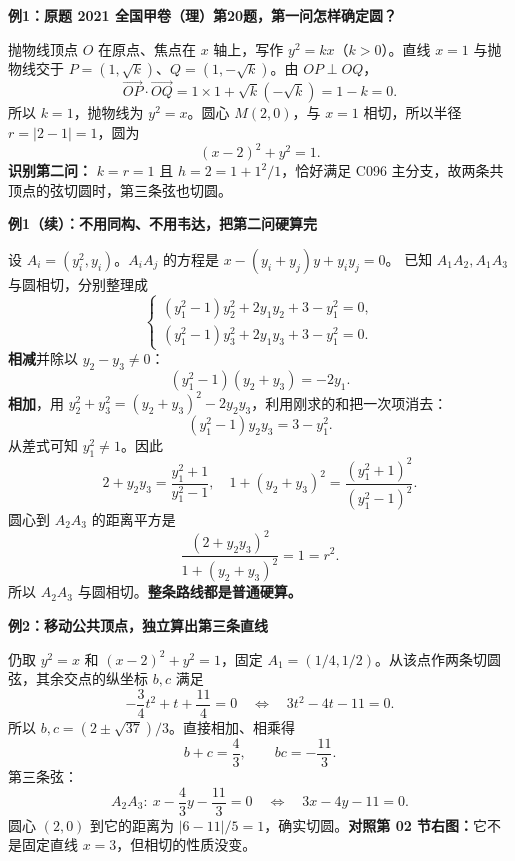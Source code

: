 \clearpage
\begin{examplebox}
\textbf{例1：原题 2021 全国甲卷（理）第20题，第一问怎样确定圆？}

抛物线顶点 $O$ 在原点、焦点在 $x$ 轴上，写作 $y^2=kx$（$k>0$）。直线 $x=1$ 与抛物线交于 $P=(1,\sqrt{k})$、$Q=(1,-\sqrt{k})$。由 $OP\perp OQ$，
\[
\overrightarrow{OP}\cdot\overrightarrow{OQ}
=1\times1+\sqrt{k}(-\sqrt{k})=1-k=0.
\]
所以 $k=1$，抛物线为 $\boxed{y^2=x}$。圆心 $M(2,0)$，与 $x=1$ 相切，所以半径 $r=|2-1|=1$，圆为
\[
\boxed{(x-2)^2+y^2=1}.
\]
\textbf{识别第二问：} $k=r=1$ 且 $h=2=1+1^2/1$，恰好满足 C096 主分支，故两条共顶点的弦切圆时，第三条弦也切圆。
\end{examplebox}

\clearpage
\begin{examplebox}
\textbf{例1（续）：不用同构、不用韦达，把第二问硬算完}

设 $A_i=(y_i^2,y_i)$。$A_iA_j$ 的方程是 $x-(y_i+y_j)y+y_iy_j=0$。
已知 $A_1A_2,A_1A_3$ 与圆相切，分别整理成
\[
\begin{cases}
(y_1^2-1)y_2^2+2y_1y_2+3-y_1^2=0,\\
(y_1^2-1)y_3^2+2y_1y_3+3-y_1^2=0.
\end{cases}
\]
\textbf{相减}并除以 $y_2-y_3\ne0$：
\[
(y_1^2-1)(y_2+y_3)=-2y_1.
\]
\textbf{相加}，用 $y_2^2+y_3^2=(y_2+y_3)^2-2y_2y_3$，利用刚求的和把一次项消去：
\[
(y_1^2-1)y_2y_3=3-y_1^2.
\]
从差式可知 $y_1^2\ne1$。因此
\[
2+y_2y_3=\frac{y_1^2+1}{y_1^2-1},\quad
1+(y_2+y_3)^2=\frac{(y_1^2+1)^2}{(y_1^2-1)^2}.
\]
圆心到 $A_2A_3$ 的距离平方是
\[
\frac{(2+y_2y_3)^2}{1+(y_2+y_3)^2}=1=r^2.
\]
所以 $A_2A_3$ 与圆相切。\textbf{整条路线都是普通硬算。}
\end{examplebox}

\clearpage
\begin{examplebox}
\textbf{例2：移动公共顶点，独立算出第三条直线}

仍取 $y^2=x$ 和 $(x-2)^2+y^2=1$，固定 $A_1=(1/4,1/2)$。从该点作两条切圆弦，其余交点的纵坐标 $b,c$ 满足
\[
-\frac34t^2+t+\frac{11}{4}=0
\quad\Longleftrightarrow\quad 3t^2-4t-11=0.
\]
所以 $b,c=(2\pm\sqrt{37})/3$。直接相加、相乘得
\[
b+c=\frac43,\qquad bc=-\frac{11}{3}.
\]
第三条弦：
\[
A_2A_3:\ x-\frac43y-\frac{11}{3}=0
\quad\Longleftrightarrow\quad \boxed{3x-4y-11=0}.
\]
圆心 $(2,0)$ 到它的距离为 $|6-11|/5=1$，确实切圆。\textbf{对照第 02 节右图：}它不是固定直线 $x=3$，但相切的性质没变。
\end{examplebox}

